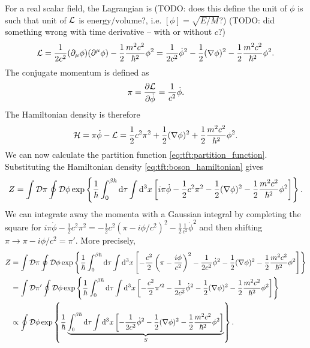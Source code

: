 For a real scalar field, the Lagrangian is 
(TODO: does this define the unit of $\phi$ is such that unit of $\mathcal{L}$ is $\text{energy} / \text{volume}$?, i.e. $[\phi] = \sqrt{E/M}$?)
(TODO: did something wrong with time derivative -- with or without $c$?)
\begin{equation}
	\mathcal{L} = \frac{1}{2 c^2} (\partial_\mu \phi) (\partial^\mu \phi) - \frac12 \frac{m^2 c^2}{\hbar^2} \phi^2
	      = \frac{1}{2 c^2} \dot{\phi}^2 - \frac12 (\nabla \phi)^2 - \frac12 \frac{m^2 c^2}{\hbar^2} \phi^2 .
\end{equation}
The conjugate momentum is defined as
\begin{equation}
	\pi = \pdv{\mathcal{L}}{\dot{\phi}} = \frac{1}{c^2} \dot{\phi} .
\end{equation}
The Hamiltonian density is therefore
\begin{equation}
	\mathcal{H} = \pi \dot{\phi} - \mathcal{L} = \frac12 c^2 \pi^2 + \frac12 (\nabla \phi)^2 + \frac12 \frac{m^2 c^2}{\hbar^2} \phi^2 .
\label{eq:tft:boson_hamiltonian}
\end{equation}
We can now calculate the partition function \eqref{eq:tft:partition_function}.
Substituting the Hamiltonian density \eqref{eq:tft:boson_hamiltonian} gives
\begin{equation}
	Z = \int \mathcal{D} \pi \oint \mathcal{D} \phi \exp \left\{ \frac{1}{\hbar} \int_0^{\beta \hbar} \mathop{}\!\mathrm{d} \tau \int \mathop{}\!\mathrm{d}^3 x \left[ i \pi \dot{\phi} - \frac12 c^2 \pi^2 - \frac12 (\nabla \phi)^2 - \frac12 \frac{m^2 c^2}{\hbar^2} \phi^2 \right] \right\} .
\end{equation}
We can integrate away the momenta with a Gaussian integral by completing the square for $i \pi \dot{\phi} - \frac12 c^2 \pi^2 = -\frac12 c^2 (\pi - i \phi / c^2)^2 - \frac12 \frac{1}{c^2} \dot{\phi}^2$ and then shifting $\pi \rightarrow \pi - i \phi / c^2 = \pi'$.
More precisely,
\begin{equation}
\begin{split}
	Z & =       \int \mathcal{D} \pi  \oint \mathcal{D} \phi \exp \left\{ \frac{1}{\hbar} \int_0^{\beta \hbar} \mathop{}\!\mathrm{d} \tau \int \mathop{}\!\mathrm{d}^3 x \left[ -\frac{c^2}{2} \left( \pi - \frac{i \phi}{c^2}\right )^2 - \frac{1}{2 c^2} \dot{\phi}^2 - \frac12 (\nabla \phi)^2 - \frac12 \frac{m^2 c^2}{\hbar^2} \phi^2 \right] \right\} \\
	  & =       \int \mathcal{D} \pi' \oint \mathcal{D} \phi \exp \left\{ \frac{1}{\hbar} \int_0^{\beta \hbar} \mathop{}\!\mathrm{d} \tau \int \mathop{}\!\mathrm{d}^3 x \left[ -\frac{c^2}{2} \pi'^2                                    - \frac{1}{2 c^2} \dot{\phi}^2 - \frac12 (\nabla \phi)^2 - \frac12 \frac{m^2 c^2}{\hbar^2} \phi^2 \right] \right\} \\
	  & \propto                       \oint \mathcal{D} \phi \exp \left\{ \frac{1}{\hbar} \underbrace{\int_0^{\beta \hbar} \mathop{}\!\mathrm{d} \tau \int \mathop{}\!\mathrm{d}^3 x \left[                                              - \frac{1}{2 c^2} \dot{\phi}^2 - \frac12 (\nabla \phi)^2 - \frac12 \frac{m^2 c^2}{\hbar^2} \phi^2 \right] }_{S} \right\} .
\end{split}
\label{eq:tft:boson_partition_function_momentum_out}
\end{equation}
